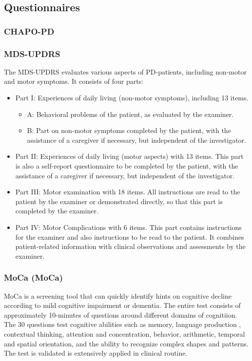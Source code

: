 \subsection{Questionnaires}
\label{subsec:questionnaires}
\subsubsection{\acl{CHAPO-PD}}

\subsubsection{\acl{MDS-UPDRS}}
The \ac{MDS-UPDRS} evaluates various aspects of \ac{PD}-patients, including non-motor and motor symptoms. It consists of four parts:
\begin{itemize}
\item Part I: Experiences of daily living (non-motor symptoms), including 13 items.
\begin{itemize}
\item A: Behavioral problems of the patient, as evaluated by the examiner.
\item B: Part on non-motor symptoms completed by the patient, with the assistance of a caregiver if necessary, but independent of the investigator.
\end{itemize}
\item Part II: Experiences of daily living (motor aspects) with 13 items. This part is also a self-report questionnaire to be completed by the patient, with the assistance of a caregiver if necessary, but independent of the investigator.
\item Part III: Motor examination with 18 items. All instructions are read to the patient by the examiner or demonstrated directly, so that this part is completed by the examiner.
\item Part IV: Motor Complications with 6 items. This part contains instructions for the examiner and also instructions to be read to the patient. It combines patient-related information with clinical observations and assessments by the examiner.
\end{itemize}

\subsubsection{\acl{MoCa} (\acs{MoCa})}
\acl{MoCa} is a screening tool that can quickly identify hints on cognitive decline according to mild cognitive impairment or dementia. The entire test consists of approximately 10-minutes of questions around different domains of cognitiion. The 30 questions test cognitive abilities such as memory, language production , contextual thinking, attention and concentration, behavior, arithmetic, temporal and spatial orientation, and the ability to recognize complex shapes and patterns. The test is validated is extensively applied in clinical routine. 

